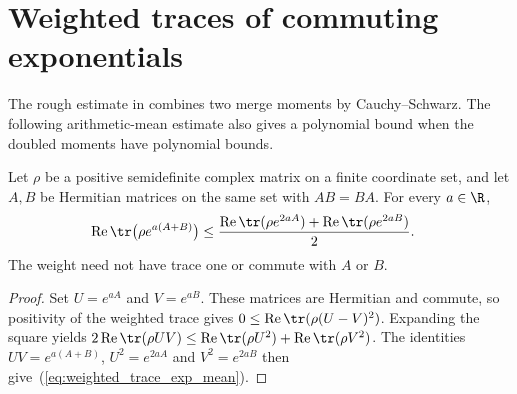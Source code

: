 \section{Weighted traces of commuting exponentials}
\label{sec:weighted_trace_exponential}

The rough estimate in \cite[Section~7, lines 553--555]{OpenAI2026AreaLaw} combines two
merge moments by Cauchy--Schwarz. The following arithmetic-mean estimate
also gives a polynomial bound when the doubled moments have polynomial
bounds.

\begin{theorem}
\label{thm:weighted_trace_exponential}
\leanok
Let $\rho$ be a positive semidefinite complex matrix on a finite coordinate
set, and let $A,B$ be Hermitian matrices on the same set with $AB=BA$.
For every $a\in\R$,
\begin{align}
 \operatorname{Re}\tr\bigl(\rho e^{a(A+B)}\bigr)
 &\le \frac{\operatorname{Re}\tr(\rho e^{2aA})
       +\operatorname{Re}\tr(\rho e^{2aB})}{2}.
 \label{eq:weighted_trace_exp_mean}
\end{align}
The weight need not have trace one or commute with $A$ or $B$.
\end{theorem}

\begin{proof}\leanok
Set $U=e^{aA}$ and $V=e^{aB}$. These matrices are Hermitian and commute,
so positivity of the weighted trace gives
$0\le\operatorname{Re}\tr(\rho(U-V)^2)$.
Expanding the square yields
$2\operatorname{Re}\tr(\rho UV)
 \le\operatorname{Re}\tr(\rho U^2)+\operatorname{Re}\tr(\rho V^2)$.
The identities $UV=e^{a(A+B)}$, $U^2=e^{2aA}$ and $V^2=e^{2aB}$
then give~(\ref{eq:weighted_trace_exp_mean}).
\end{proof}
